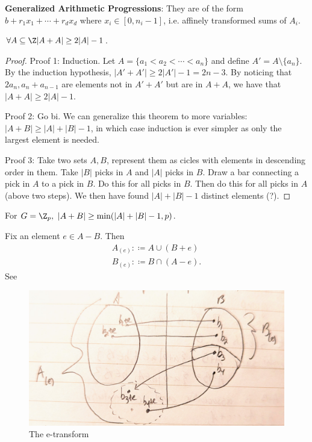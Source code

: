 \documentclass[a4paper]{article}
\begin{document}
\begin{definition}
	\textbf{Generalized Arithmetic Progressions}: They are of the form $b + r_{1}x_{1}+\cdots + r_dx_d $ where $x_i \in [0,n_i-1]$, i.e. affinely transformed sums of $A_i $.
\end{definition}

\begin{thm}
	$\forall A \subseteq \Z |A+A| \ge 2|A|-1$.
\end{thm}

\begin{proof}
	Proof 1: Induction. Let $A = \{a_{1} < a_{2} < \cdots < a_n\}   $ and define $A' = A \setminus \{a_n\}   $.
	By the induction hypothesis, $|A'+A'| \ge 2|A'| - 1 = 2n-3 $.
	By noticing that $2a_n, a_n + a_{n-1} $ are elements not in $A'+A' $ but are in $A+A $, we have that $|A+A| \ge 2|A| - 1 $.

	Proof 2: Go bi. We can generalize this theorem to more variables: $|A+B| \ge |A| + |B| - 1 $, in which case induction is ever simpler as only the largest element is needed.

	Proof 3: Take two sets $A,B $, represent them as cicles with elements in descending order in them.
	Take $|B| $ picks in $A $ and $|A| $ picks in $B $.
	Draw a bar connecting a pick in $A $ to a pick in $B $.
	Do this for all picks in $B $.
	Then do this for all picks in $A $ (above two steps).
	We then have found $|A| + |B| - 1 $ distinct elements (?).
\end{proof}

\begin{thm}
	For $G = \Z_p,\ |A+B| \ge \min(|A|+|B| - 1, p) $.
\end{thm}

\begin{definition}
	Fix an element $e \in A-B $.
	Then
	\begin{align*}
		A_{(e)} :\coloneqq  A \cup (B+e) \\
		B_{(e)} :\coloneqq B \cap (A - e)
	.\end{align*}
	See 
\end{definition}

\begin{figure}[ht]
	\centering
	\includegraphics[width = .5\textwidth]{wall}
	\caption{The e-transform}
\end{figure}
\end{document}
